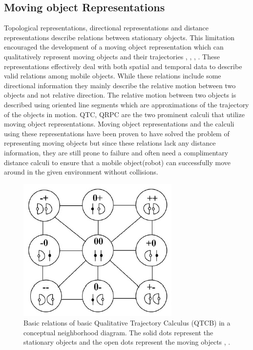 		
		\subsection{Moving object Representations}  Topological representations, directional representations
		 and distance representations describe relations between stationary objects. This limitation encouraged the development of a moving object representation which can qualitatively represent moving objects and their trajectories \cite{cohn1997qualitative}, \cite{chen2015survey}, \cite{cohn2001qualitative}, \cite{cohn2008qualitative} . These representations effectively deal with both spatial and temporal data to describe valid relations among mobile objects. While these relations include some directional information they mainly describe the relative motion between two objects and not relative direction. The relative motion between two objects is described using oriented line segments which are approximations of the trajectory of the objects in motion. QTC, QRPC are the two prominent calculi that utilize moving object representations. Moving object representations and the calculi using these representations have been proven to have solved the problem of representing moving objects but since these relations lack any distance information, they are still prone to failure and often need a complimentary distance calculi to ensure that a mobile object(robot) can successfully move around in the given environment without collisions.
		
		\begin{figure}[h]
			\centering
			\includegraphics[scale=1]{images/qtcb}
			\caption{Basic relations of basic Qualitative Trajectory Calculus (QTCB) in a conceptual neighborhood diagram. The solid dots represent the stationary objects and the open dots represent the moving objects \cite{bibid}, \cite{de_weghe}.}
			\label{fig:qtcb}
		\end{figure}		
		
